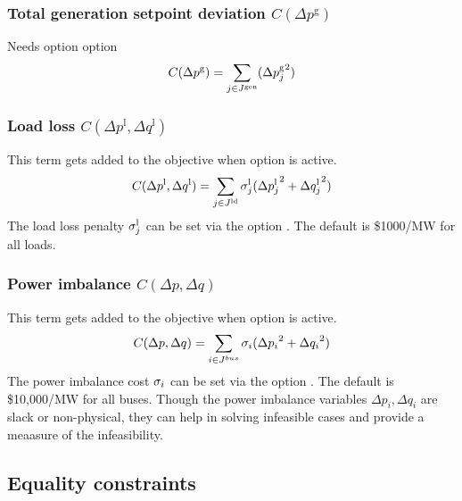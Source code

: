 \subsubsection{Total generation setpoint deviation $C(\Delta p^{\text{g}})$}
Needs option \opflowoption{\opflowobjective}{\mingensetpointdeviation} option
\begin{equation}
C(\Delta p^{\text{g}}) = \sum_{j \in J^\text{gen}} ({\Delta{p}^\text{g}_j}^2)
\label{eq:opf_obj_mingensetpointdev}
\end{equation}

\subsubsection{Load loss $C(\Delta p^{\text{l}},\Delta q^{\text{l}})$}
This term gets added to the objective when  \option{\opflowincludeloadloss} option is active. 
\begin{equation}
C(\Delta p^{\text{l}},\Delta q^{\text{l}}) =  \sum_{j \in J^\text{ld}} \sigma^\text{l}_j({\Delta{p}^{\text{l}}_j}^2 + {\Delta{q}^{\text{l}}_j}^2)
\label{eq:opf_obj_minloadloss}
\end{equation}
The load loss penalty $\sigma^\text{l}_j$ can be set via the option . The default is \$1000/MW for all loads.

\subsubsection{Power imbalance $C(\Delta p,\Delta q)$}
This term gets added to the objective when   option is active. 
\begin{equation}
C(\Delta p,\Delta q) =  \sum_{i \in J^{bus}} \sigma_i({\Delta p_i}^2 + {\Delta q_i}^2)
\label{eq:opf_obj_minpowerimbalance}
\end{equation}
The power imbalance cost $\sigma_i$ can be set via the option . The default is \$10,000/MW for all buses. Though the power imbalance variables $\Delta p_i,\Delta q_i$ are slack or non-physical, they can help in solving infeasible cases and provide a meaasure of the infeasibility. 

\subsection{Equality constraints}\label{sec:opflow_eq}

